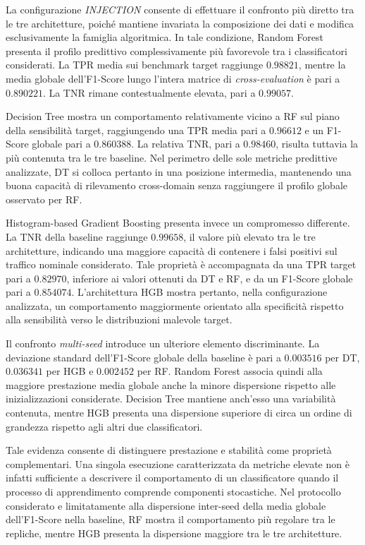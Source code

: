 La configurazione \textit{INJECTION} consente di effettuare il confronto più diretto tra le tre architetture, poiché mantiene invariata la composizione dei dati e modifica esclusivamente la famiglia algoritmica.
In tale condizione, Random Forest presenta il profilo predittivo complessivamente più favorevole tra i classificatori considerati.
La TPR media sui benchmark target raggiunge $0.98821$, mentre la media globale dell'F1-Score lungo l'intera matrice di \textit{cross-evaluation} è pari a $0.890221$.
La TNR rimane contestualmente elevata, pari a $0.99057$.

Decision Tree mostra un comportamento relativamente vicino a RF sul piano della sensibilità target, raggiungendo una TPR media pari a $0.96612$ e un F1-Score globale pari a $0.860388$.
La relativa TNR, pari a $0.98460$, risulta tuttavia la più contenuta tra le tre baseline.
Nel perimetro delle sole metriche predittive analizzate, DT si colloca pertanto in una posizione intermedia, mantenendo una buona capacità di rilevamento cross-domain senza raggiungere il profilo globale osservato per RF.

Histogram-based Gradient Boosting presenta invece un compromesso differente.
La TNR della baseline raggiunge $0.99658$, il valore più elevato tra le tre architetture, indicando una maggiore capacità di contenere i falsi positivi sul traffico nominale considerato.
Tale proprietà è accompagnata da una TPR target pari a $0.82970$, inferiore ai valori ottenuti da DT e RF, e da un F1-Score globale pari a $0.854074$.
L'architettura HGB mostra pertanto, nella configurazione analizzata, un comportamento maggiormente orientato alla specificità rispetto alla sensibilità verso le distribuzioni malevole target.

Il confronto \textit{multi-seed} introduce un ulteriore elemento discriminante.
La deviazione standard dell'F1-Score globale della baseline è pari a $0.003516$ per DT, $0.036341$ per HGB e $0.002452$ per RF.
Random Forest associa quindi alla maggiore prestazione media globale anche la minore dispersione rispetto alle inizializzazioni considerate.
Decision Tree mantiene anch'esso una variabilità contenuta, mentre HGB presenta una dispersione superiore di circa un ordine di grandezza rispetto agli altri due classificatori.

Tale evidenza consente di distinguere prestazione e stabilità come proprietà complementari.
Una singola esecuzione caratterizzata da metriche elevate non è infatti sufficiente a descrivere il comportamento di un classificatore quando il processo di apprendimento comprende componenti stocastiche.
Nel protocollo considerato e limitatamente alla dispersione inter-seed della media globale dell'F1-Score nella baseline, RF mostra il comportamento più regolare tra le repliche, mentre HGB presenta la dispersione maggiore tra le tre architetture.

